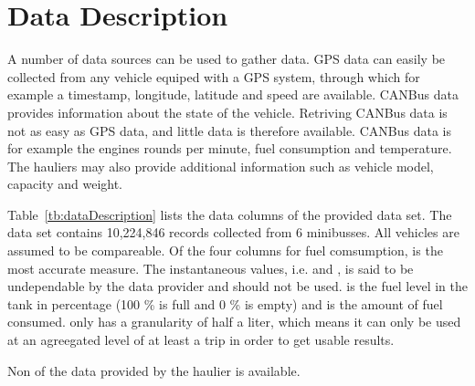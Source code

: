 \section{Data Description}
A number of data sources can be used to gather data.
GPS data can easily be collected from any vehicle equiped with a GPS system, through which for example a timestamp, longitude, latitude and speed are available.
CANBus data provides information about the state of the vehicle.  %
Retriving CANBus data is not as easy as GPS data, and little data is therefore available. 
CANBus data is for example the engines rounds per minute, fuel consumption and temperature. 
The hauliers may also provide additional information such as vehicle model, capacity and weight. 

Table~\ref{tb:dataDescription} lists the data columns of the provided data set.
The data set contains 10,224,846 records collected from 6 minibusses. 
All vehicles are assumed to be compareable.%
Of the four columns for fuel comsumption,  is the most accurate measure.
The instantaneous values, i.e.  and , is said to be undependable by the data provider and should not be used. 
 is the fuel level in the tank in percentage (100 \% is full and 0 \% is empty) and  is the amount of fuel consumed.
 only has a granularity of half a liter, which means it can only be used at an agreegated level of at least a trip in order to get usable results.

Non of the data provided by the haulier is available.
